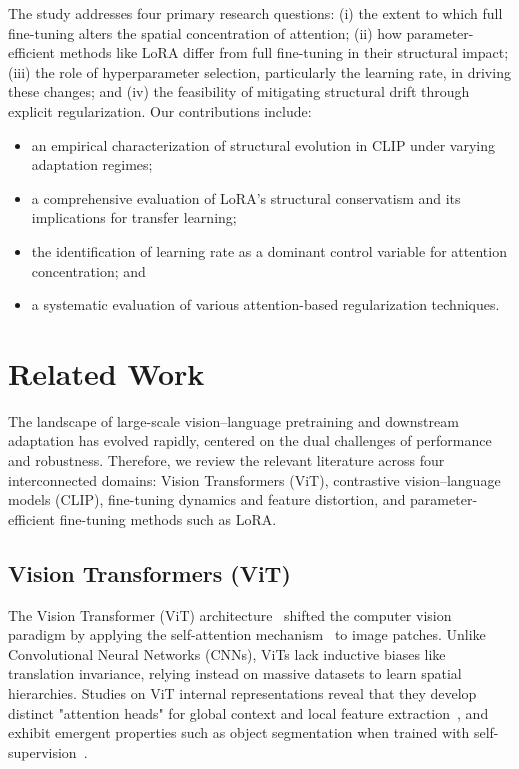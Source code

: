 \documentclass[ai,article,submit,pdftex,oneauthor]{Definitions/mdpi}
\begin{document}
The study addresses four primary research questions: (i) the extent to which full fine-tuning alters the spatial concentration of attention; (ii) how parameter-efficient methods like LoRA differ from full fine-tuning in their structural impact; (iii) the role of hyperparameter selection, particularly the learning rate, in driving these changes; and (iv) the feasibility of mitigating structural drift through explicit regularization. Our contributions include:
\begin{itemize}
    \item an empirical characterization of structural evolution in CLIP under varying adaptation regimes;
    \item a comprehensive evaluation of LoRA's structural conservatism and its implications for transfer learning;
    \item the identification of learning rate as a dominant control variable for attention concentration; and
    \item a systematic evaluation of various attention-based regularization techniques.
\end{itemize}

\section{Related Work}
The landscape of large-scale vision--language pretraining and downstream adaptation has evolved rapidly, centered on the dual challenges of performance and robustness. Therefore, we review the relevant literature across four interconnected domains: Vision Transformers (ViT), contrastive vision--language models (CLIP), fine-tuning dynamics and feature distortion, and parameter-efficient fine-tuning methods such as LoRA.

\subsection{Vision Transformers (ViT)}
The Vision Transformer (ViT) architecture~\cite{dosovitskiy2021image} shifted the computer vision paradigm by applying the self-attention mechanism~\cite{vaswani2017attention} to image patches. Unlike Convolutional Neural Networks (CNNs), ViTs lack inductive biases like translation invariance, relying instead on massive datasets to learn spatial hierarchies. Studies on ViT internal representations reveal that they develop distinct "attention heads" for global context and local feature extraction~\cite{raghu2021vision}, and exhibit emergent properties such as object segmentation when trained with self-supervision~\cite{caron2021emerging}.
\end{document}
